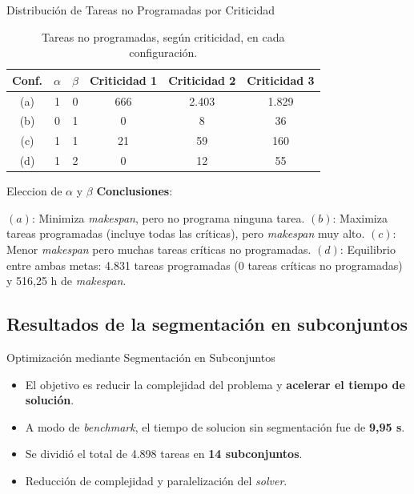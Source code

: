 \documentclass[pdfpagelabels=false, usepdftitle=false, aspectratio=169]{beamer}
\begin{document}
\begin{frame}{Distribución de Tareas no Programadas por Criticidad}
    \begin{table}[htbp]
        \centering
        \footnotesize
        \begin{tabular}{c c c c c c}
            \toprule
            \textbf{Conf.} & \(\alpha\) & \(\beta\) & 
            \textbf{Criticidad 1} & 
            \textbf{Criticidad 2} & \textbf{Criticidad 3} \\
            \midrule
            (a) & 1 & 0 & 666 & 2.403 & 1.829 \\
            (b) & 0 & 1 & 0   & 8     & 36 \\
            (c) & 1 & 1 & 21  & 59    & 160 \\
            (d) & 1 & 2 & 0   & 12    & 55 \\
            \bottomrule
        \end{tabular}
        \caption{Tareas no programadas, según criticidad, en cada configuración.}
        \label{tab:alpha_beta_impact}
    \end{table}
    \vfill
\end{frame}

\begin{frame}{Eleccion de \(\alpha\) y \(\beta\)}
    \textbf{Conclusiones}:
    \begin{itemize}
        \arrowitem \((a)\): Minimiza \textit{makespan}, pero no programa ninguna tarea.
        \arrowitem \((b)\): Maximiza tareas programadas (incluye todas las críticas), pero \textit{makespan} muy alto.
        \arrowitem \((c)\): Menor \textit{makespan} pero muchas tareas críticas no programadas.
        \arrowitem \((d)\): Equilibrio entre ambas metas: 4.831 tareas programadas (0 tareas críticas no programadas) y 516,25 h de \textit{makespan}.
    \end{itemize}
    \vfill
    \end{frame}
\subsection{Resultados de la segmentación en subconjuntos}

\begin{frame}{Optimización mediante Segmentación en Subconjuntos}
    \begin{itemize}
        \item El objetivo es reducir la complejidad del problema y \textbf{acelerar el tiempo de solución}.
        \item A modo de \textit{benchmark}, el tiempo de solucion sin segmentación fue de \textbf{9,95 s}.
        \item Se dividió el total de 4.898 tareas en \textbf{14 subconjuntos}.
        \item Reducción de complejidad y paralelización del \textit{solver}.
    \end{itemize}
    \vfill
\end{frame}
\end{document}
